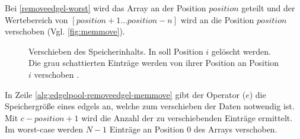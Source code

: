 Bei \autoref{removeedgel-worst} wird das Array an der Position $\mathit{position}$ geteilt und der Wertebereich von
 $[\mathit{position}+1 \dotsc \mathit{position}-n]$ wird an die Position $\mathit{position}$ verschoben
 (Vgl. \autoref{fig:memmove}).
\begin{figure}[!ht]
	\centering
	\subfigure[]{
		
		\label{fig:memmove-before}
	}
	\subfigure[]{
		
		\label{fig:memmove-after}
	}
	\caption{Verschieben des Speicherinhalts. In  soll Position $i$ gelöscht werden. Die
	 grau schattierten Einträge werden von ihrer Position an Position $i$ verschoben .}
	\label{fig:memmove}
\end{figure}
In Zeile \ref{alg:edgelpool-removeedgel-memmove} gibt der Operator ($e$) die Speichergröße eines
 \glspl{edgel} an, welche zum verschieben der Daten notwendig ist. Mit $c - \mathit{position} + 1$ wird die Anzahl der
 zu verschiebenden Einträge ermittelt. Im worst-case werden $N-1$ Einträge an Position $0$ des Arrays verschoben.

